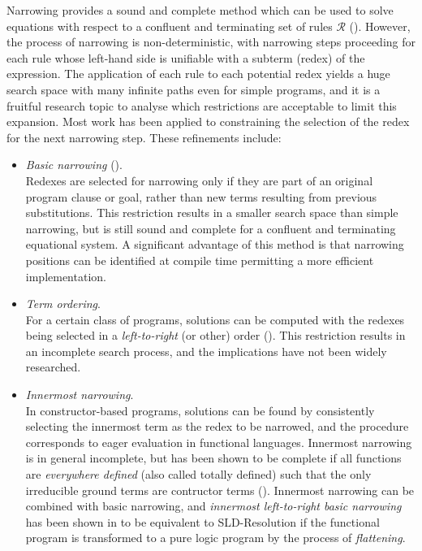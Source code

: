 Narrowing provides a sound and complete method which can be used to solve
equations with respect to a confluent and terminating set of rules
$\mathcal{R}$ (\cite{Hul80}).  However, the process of narrowing
is non-deterministic, with narrowing steps proceeding
for each rule whose left-hand side is unifiable with a subterm (redex)
of the expression.  The application of each rule to each potential redex
yields a huge search space with many infinite paths even for simple
programs, and it is a fruitful research topic to analyse which 
restrictions are acceptable to limit this expansion.  Most work has been
applied to constraining the selection of the redex for the
next narrowing step.  These refinements include:

\begin{itemize}

\item{\textit{Basic narrowing} (\cite{Hul80}).\\
  Redexes are selected for narrowing only if they are part of an original
  program clause or goal, rather than new terms resulting from previous
  substitutions.  This restriction results in a smaller search space than
  simple narrowing, but is still sound and complete for a confluent and
  terminating equational system.  A significant advantage of this method is
  that narrowing positions can be identified at compile time permitting a
  more efficient implementation.
  }

\item{\textit{Term ordering}.\\
  For a certain class of programs, solutions can be computed with the redexes
  being selected in a \textit{left-to-right} (or other) order (\cite{Han94}).
  This restriction results in an incomplete search process, and the implications
  have not been widely researched.
  }

\item{\textit{Innermost narrowing}.\\
  In constructor-based programs, solutions can be found by consistently
  selecting the innermost term as the redex to be narrowed,  and the
  procedure corresponds to eager evaluation in functional languages.
  Innermost narrowing is in general incomplete, but has been shown to be
  complete if all functions are \textit{everywhere defined} (also called
  totally defined) such that the only irreducible ground terms are contructor
  terms (\cite{Fri85}).  Innermost narrowing can be combined with basic narrowing,
  and \textit{innermost left-to-right basic narrowing} has been shown in 
  \cite{BGM88} to be equivalent to SLD-Resolution if the functional program is
  transformed to a pure logic program by the process of \textit{flattening}.
  }


\end{itemize}
